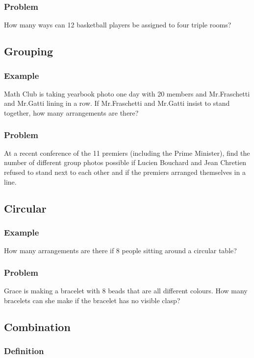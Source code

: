 \documentclass{article}
\begin{document}
\subsubsection{Problem}
How many ways can 12 basketball players be assigned to four triple rooms?
\pagebreak

\subsection{Grouping}
\subsubsection{Example}
Math Club is taking yearbook photo one day with 20 members and Mr.Fraschetti and Mr.Gatti lining in a row. If Mr.Fraschetti and Mr.Gatti insist to stand together, how many arrangements are there?
\vspace{20px}
\subsubsection{Problem}
At a recent conference of the 11 premiers (including the Prime Minister), find the number of different group photos possible if Lucien Bouchard and Jean Chretien
refused to stand next to each other and if the premiers arranged themselves in a line.
\vspace{20px}
\subsection{Circular}
\subsubsection{Example}
How many arrangements are there if 8 people sitting around a circular table?
\vspace{20px}
\subsubsection{Problem}
Grace is making a bracelet with 8 beads that are all different colours. How many bracelets can she make if the bracelet has no visible clasp?
\vspace{20px}
\subsection{Combination}
\subsubsection{Definition}
\vspace{20px}
\end{document}
